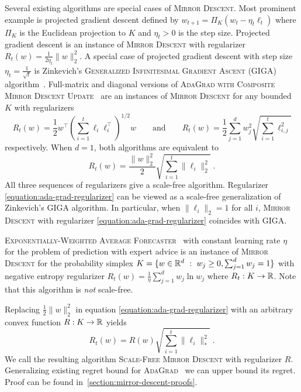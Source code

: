 Several existing algorithms are special cases of \textsc{Mirror Descent}. Most
prominent example is projected gradient descent defined by $w_{t+1} = \Pi_K(w_t
- \eta_t \ell_t)$ where $\Pi_K$ is the Euclidean projection to $K$ and
$\eta_t>0$ is the step size.  Projected gradient descent is an instance of
\textsc{Mirror Descent} with regularizer $R_t(w) = \frac{1}{2\eta_t}\|w\|_2^2$.
A special case of projected gradient descent with step size $\eta_t =
\frac{1}{\sqrt{t}}$ is Zinkevich's \textsc{Generalized Infinitesimal Gradient
Ascent} (GIGA) algorithm~\cite{Zinkevich-2003}. Full-matrix and diagonal
versions of \textsc{AdaGrad with Composite Mirror Descent
Update}~\cite{Duchi-Hazan-Singer-2011} are an instances of \textsc{Mirror
Descent} for any bounded $K$ with regularizers
$$
R_t(w) = \frac{1}{2} w^\top \left(\sum_{i=1}^t \ell_i \ell_i^\top \right)^{1/2} \!\!\!\! w
\qquad \text{and} \qquad
R_t(w) = \frac{1}{2} \sum_{j=1}^d w_j^2 \sqrt{ \sum_{i=1}^t \ell_{i,j}^2}
$$
respectively. When $d=1$, both algorithms are equivalent to
\begin{equation}
\label{equation:ada-grad-regularizer}
R_t(w) = \frac{\|w\|_2^2}{2} \sqrt{\sum_{i=1}^t \|\ell_i\|_2^2 } \; .
\end{equation}
All three sequences of regularizers give a scale-free algorithm. Regularizer
\eqref{equation:ada-grad-regularizer} can be viewed as a scale-free generalization of
Zinkevich's GIGA algorithm. In particular, when $\|\ell_i\|_2 = 1$ for all $i$,
\textsc{Mirror Descent} with regularizer \eqref{equation:ada-grad-regularizer}
coincides with GIGA.

\textsc{Exponentially-Weighted Average Forecaster}~\cite[Chapter
2]{Cesa-Bianchi-Lugosi-2006} with constant learning rate $\eta$ for the problem
of prediction with expert advice is an instance of \textsc{Mirror Descent} for
the probability simplex $K = \{ w \in \mathbb{R}^d ~:~ w_j \ge 0, \sum_{j=1}^d w_j = 1
\}$ with negative entropy regularizer $R_t(w) = \frac{1}{\eta} \sum_{j=1}^d w_j
\ln w_j$ where $R_t:K \to \mathbb{R}$. Note that this algorithm is \emph{not}
scale-free.

Replacing $\frac{1}{2}\|w\|_2^2$ in equation \eqref{equation:ada-grad-regularizer} with
an arbitrary convex function $R:K \to \mathbb{R}$ yields
\begin{equation}
\label{equation:scale-free-mirror-descent}
R_t(w) = R(w) \sqrt{\sum_{i=1}^t \|\ell_i\|_*^2} \; .
\end{equation}
We call the resulting algorithm \textsc{Scale-Free Mirror Descent} with
regularizer $R$.  Generalizing existing regret bound for
\textsc{AdaGrad}~\cite{Duchi-Hazan-Singer-2011} we can upper bound its regret.
Proof can be found in~\ref{section:mirror-descent-proofs}.

